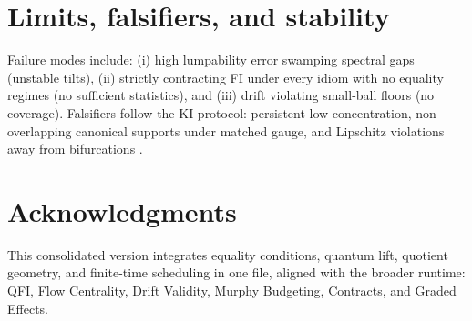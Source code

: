 \documentclass[11pt]{article}
\theoremstyle{plain}
\theoremstyle{definition}
\theoremstyle{remark}
\newcommand{\1}{\mathbbm{1}}
\begin{document}
\section{Limits, falsifiers, and stability}
Failure modes include: (i) high lumpability error swamping spectral gaps (unstable tilts), (ii) strictly contracting FI under every idiom with no equality regimes (no sufficient statistics), and (iii) drift violating small-ball floors (no coverage). Falsifiers follow the KI protocol: persistent low concentration, non-overlapping canonical supports under matched gauge, and Lipschitz violations away from bifurcations \parencite{elliott2025ki,elliott2025drift}.

\section*{Acknowledgments}
This consolidated version integrates equality conditions, quantum lift, quotient geometry, and finite-time scheduling in one file, aligned with the broader runtime: QFI, Flow Centrality, Drift Validity, Murphy Budgeting, Contracts, and Graded Effects.

\printbibliography
\end{document}
